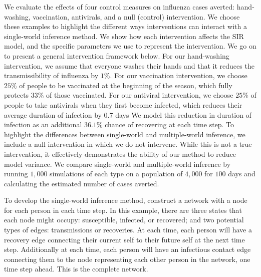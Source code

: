\documentclass[openacc]{rsproca_new}%
\begin{document}
We evaluate the effects of four control measures on influenza cases averted: hand-washing, vaccination, antivirals, and a null (control) intervention.
We choose these examples to highlight the different ways interventions can interact with a single-world inference method.
We show how each intervention affects the SIR model, and the specific parameters we use to represent the intervention.
We go on to present a general intervention framework below.
For our hand-washing intervention, we assume that everyone washes their hands and that it reduces the transmissibility of influenza by $1\%$.
For our vaccination intervention, we choose $25\%$ of people to be vaccinated at the beginning of the season, which fully protects $33\%$ of those vaccinated.
For our antiviral intervention, we choose $25\%$ of people to take antivirals when they first become infected, which reduces their average duration of infection by $0.7$ days \cite{oseltamivir:2014}
We model this reduction in duration of infection as an additional $36.1\%$ chance of recovering at each time step.
To highlight the differences between single-world and multiple-world inference, we include a null intervention in which we do not intervene.
While this is not a true intervention, it effectively demonstrates the ability of our method to reduce model variance.
We compare single-world and multiple-world inference by running $1,000$ simulations of each type on a population of $4,000$ for $100$ days and calculating the estimated number of cases averted.

To develop the single-world inference method, construct a network with a node for each person in each time step.
In this example, there are three states that each node might occupy: susceptible, infected, or recovered; and two potential types of edges: transmissions or recoveries.
At each time, each person will have a recovery edge connecting their current self to their future self at the next time step.
Additionally at each time, each person will have an infectious contact edge connecting them to the node representing each other person in the network, one time step ahead.
This is the complete network.
\end{document}
